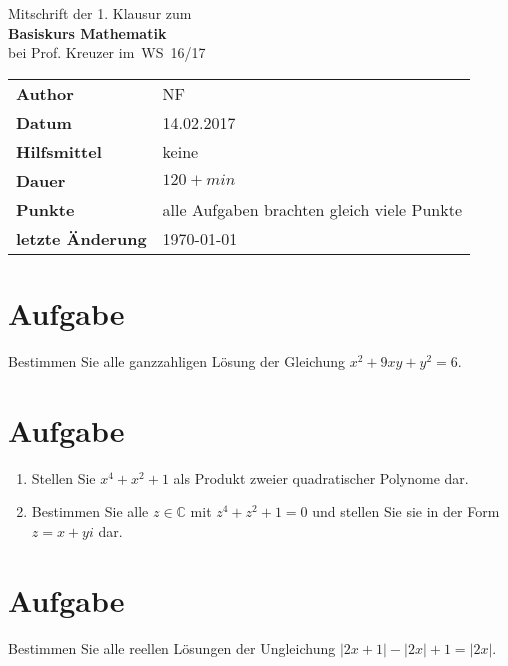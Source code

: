 \documentclass[a4paper,10pt]{article}
\begin{document}
\begin{center}
	\huge Mitschrift der 1. Klausur zum \\
	\Huge \textbf{Basiskurs Mathematik} \\
	\huge bei Prof. Kreuzer im WS 16/17 \\
	\normalsize

	\vspace{.5cm}
	\begin{tabular}[b]{l|l}
		\textbf{Author} & NF \\ %
		\textbf{Datum} & 14.02.2017 \\
		\textbf{Hilfsmittel} & keine \\
		\textbf{Dauer} & $120+ min$ \\
		\textbf{Punkte} & alle Aufgaben brachten gleich viele Punkte \\
		\textbf{letzte Änderung} & \today \\
	\end{tabular}

	\vspace{.5cm}
\end{center}

\renewcommand\thesection{\arabic{section}.}

\section{Aufgabe}
Bestimmen Sie alle ganzzahligen Lösung der Gleichung $x^2+9xy+y^2=6$.

\section{Aufgabe}
\begin{enumerate}[label=\alph*)]
\item Stellen Sie $x^4+x^2+1$ als Produkt zweier quadratischer Polynome dar.
\item Bestimmen Sie alle $z \in \mathbb{C}$ mit $z^4+z^2+1=0$ und stellen Sie sie in der Form $z = x + y i$ dar.
\end{enumerate}

\section{Aufgabe}
Bestimmen Sie alle reellen Lösungen der Ungleichung $|2x+1|-|2x|+1=|2x|$.
\end{document}
